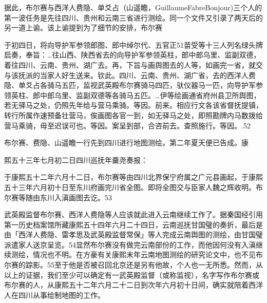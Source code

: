 据此，布尔赛与西洋人费隐、单爻占（山遥瞻，GuillaumeFabreBonjour)三个人的第一波任务是先往四川、贵州和云南三省进行测绘。同一个文件又引录了两天后的另一道上谕。该上谕提到为了细节的安排，布尔赛

于初四日，将向导护军参领郎图、郎中绰尔代、五官正51苗受等十三人列名绿头牌启奏，奉旨：…往山西、陕西省去的向导护军参领英柱，郎中郎乌里、监副双德，着往四川、云南、贵州、湖广去。再，下旨与画舆图去的人等，如画完一省，就交与该抚派的当家人好生送来。钦此。四川、云南、贵州、湖广省，去的西洋人费隐、单爻占各骑马五匹，监视武英殿布尔赛骑马四匹，驮仪器马一匹，向导护军参领英柱、郎中郎乌里、监副双德等各骑马五匹。…伊等绘画通省府州县卫所舆图，若无驿马之处，仍照先年给与营马乘骑。等因。前来。相应行文各该省督抚提镇，转行所属作速预备壮营马，俟画图各官一到，如无驿马之处，即照勘牌内马数拨给营马乘骑，毋至迟误可也。等因。案呈到部，合咨前去。查照施行。等因。.52

布尔赛、费隐、山遥瞻一行先到四川进行地图测绘。第二年夏天便已告成。康

\vfill
\begin{BookNotes}
\end{BookNotes}

\noindent 熙五十三年七月初二日四川巡抚年羹尧奏报：

\begin{BookQuote}
于康熙五十二年六月十二日，布尔赛等由四川北界保宁府属之广元县画起，于康熙五十三年六月初十日至东川府画完川省全图。即将全图交与臣家人魏之辉收明。布尔赛等随由东川入滇画图去讫。53
\end{BookQuote}

武英殿监督布尔赛、西洋人费隐等人应该就此进入云南继续工作了。据秦国经引用第一历史档案馆所藏康熙五十四年六月二十四日，云南巡抚甘国璧的奏折，最后是由「西洋人费隐、雷孝思及武英殿监督常保」等人完成云南舆图的测绘，由甘国璧派遣家人送京呈览。54显然布尔赛没有做完云南部份的工作，而他因何没有入滇继续测绘，情况也不明。在方豪有关康熙末年云南地图测绘的研究论文中，也不见布尔赛的踪影。55至于他是否被召回北京还是另有他故，个人也一无所悉。然而，从以上的证据，我们至少可以确定有一武英殿监督（或称监视），名字写作布尔赛或布尔赛的人，从康熙五十二年六月二十二日到次年六月初十日间，确实就陪着西洋人在四川从事绘制地图的工作。

